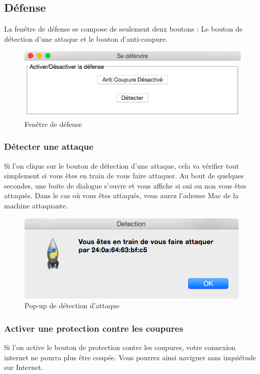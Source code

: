 \documentclass[11pt]{article}
\begin{document}
\newpage
\subsection{Défense}
La fenêtre de défense se compose de seulement deux boutons : Le bouton de détection d'une attaque et le bouton d'anti-coupure.
\begin{figure}[!h]
\centering
\includegraphics[scale=0.6]{./Captures/defense.png}
\caption{Fenêtre de défense}
\end{figure}

\subsubsection{Détecter une attaque}
Si l'on clique sur le bouton de détection d'une attaque, cela va vérifier tout simplement si vous êtes en train de vous faire attaquer. Au bout de quelques secondes, une boite de dialogue s'ouvre et vous affiche si oui ou non vous êtes attaqués. Dans le cas où vous êtes attaqués, vous aurez l'adresse Mac de la machine attaquante.
\begin{figure}[!h]
\centering
\includegraphics[scale=0.6]{./Captures/detection.png}
\caption{Pop-up de détection d'attaque}
\end{figure}
\subsubsection{Activer une protection contre les coupures}
Si l'on active le bouton de protection contre les coupures, votre connexion internet ne pourra plus être coupée. Vous pourrez ainsi naviguer sans inquiétude sur Internet.
\end{document}
